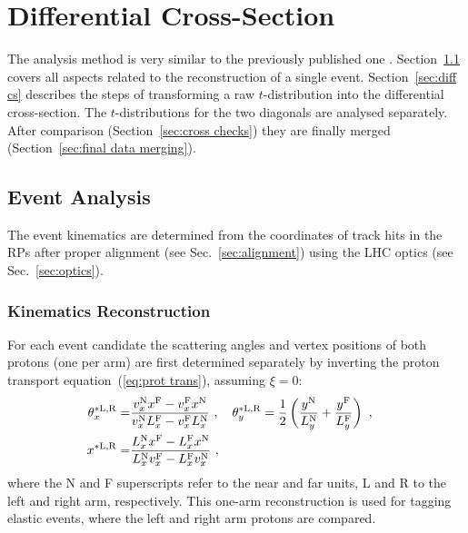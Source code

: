 \section{Differential Cross-Section}
\label{sec:differential cross-section}

\iffalse

The analysis method is very similar to the previously published one \cite{8tev-90m}. Section~\ref{sec:event analysis} covers all aspects related to the reconstruction of a single event. Section~\ref{sec:diff cs} describes the steps of transforming a raw $t$-distribution into the differential cross-section. The $t$-distributions for the two diagonals are analysed separately. After comparison (Section~\ref{sec:cross checks}) they are finally merged (Section~\ref{sec:final data merging}).

\subsection{Event Analysis}
\label{sec:event analysis}

The event kinematics are determined from the coordinates of track hits in the RPs after proper alignment (see Sec.~\ref{sec:alignment}) using the LHC optics (see Sec.~\ref{sec:optics}).


\subsubsection{Kinematics Reconstruction}
\label{sec:kinematics}

For each event candidate 
the scattering angles and vertex positions of both protons (one per arm) are first determined separately by inverting the proton transport equation~(\ref{eq:prot trans}), assuming $\xi = 0$:
\begin{equation}
\label{eq:kin 1a}
	\begin{aligned}
		\theta_x^{*\rm L,R} =& {v_x^{\rm N} x^{\rm F} - v_x^{\rm F} x^{\rm N}\over v_x^{\rm N} L_x^{\rm F} - v_x^{\rm F} L_x^{\rm N}}\ ,\quad
			\theta_y^{*\rm L,R} = {1\over 2} \left( {y^{\rm N}\over L_y^{\rm N}} + {y^{\rm F}\over L_y^{\rm F}} \right)\ ,\cr
		x^{*\rm L,R} =& {L_x^{\rm N} x^{\rm F} - L_x^{\rm F} x^{\rm N}\over L_x^{\rm N} v_x^{\rm F} - L_x^{\rm F} v_x^{\rm N}}\ ,\cr
	\end{aligned}
\end{equation}
where the N and F superscripts refer to the near and far units, L and R to the left and right arm, respectively. 
This one-arm reconstruction is used for tagging elastic events, where the left and right arm protons are compared.


